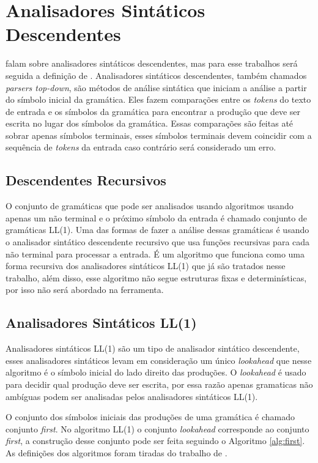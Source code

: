 \section{Analisadores Sintáticos Descendentes}
\textcite{cooper2022engineering,mogensen2024introduction, thain2020introduction} falam sobre analisadores sintáticos descendentes, mas para esse trabalhos será seguida a definição de \textcite{thain2020introduction}. Analisadores sintáticos descendentes, também chamados \textit{parsers top-down}, são métodos de análise sintática que iniciam a análise a partir do símbolo inicial da gramática. Eles fazem comparações entre os \textit{tokens} do texto de entrada e os símbolos da gramática para encontrar a produção que deve ser escrita no lugar dos símbolos da gramática. Essas comparações são feitas até sobrar apenas símbolos terminais, esses símbolos terminais devem coincidir com a sequência de \textit{tokens} da entrada caso contrário será considerado um erro.

\subsection{Descendentes Recursivos}
O conjunto de gramáticas que pode ser analisados usando algoritmos usando apenas um não terminal e o próximo símbolo da entrada é chamado conjunto de gramáticas LL(1). Uma das formas de fazer a análise dessas gramáticas é usando o analisador sintático descendente recursivo que usa funções recursivas para cada não terminal para processar a entrada. É um algoritmo que funciona como uma forma recursiva dos analisadores sintáticos LL(1) que já são tratados nesse trabalho, além disso, esse algoritmo não segue estruturas fixas e determinísticas, por isso não será abordado na ferramenta.

\subsection{Analisadores Sintáticos LL(1)}
Analisadores sintáticos LL(1) são um tipo de analisador sintático descendente, esses analisadores sintáticos levam em consideração um único \textit{lookahead} que nesse algoritmo é o símbolo inicial do lado direito das produções. O \textit{lookahead} é usado para decidir qual produção deve ser escrita, por essa razão apenas gramaticas não ambíguas podem ser analisadas pelos analisadores sintáticos LL(1).

O conjunto dos símbolos iniciais das produções de uma gramática é chamado conjunto \textit{first}. No algoritmo LL(1) o conjunto \textit{lookahead} corresponde ao conjunto \textit{first}, a construção desse conjunto pode ser feita seguindo o Algoritmo \ref{alg:first}. As definições dos algoritmos foram tiradas do trabalho de \textcite{thain2020introduction}.

